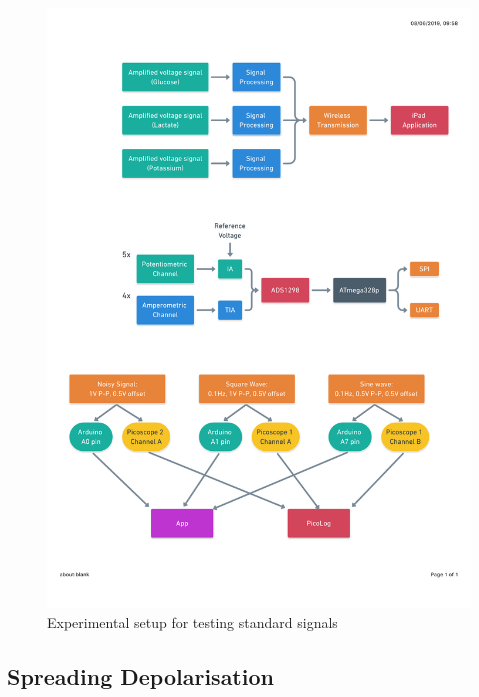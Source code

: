 \begin{figure}[h!]
\centering
\includegraphics[trim={0cm 0cm 0cm  0cm}, clip, width=.8\textwidth]{./figures/test1.pdf}
\captionsetup{justification=centering}
\caption{Experimental setup for testing standard signals}
\label{fig: test1}
\end{figure}


\subsection{Spreading Depolarisation}